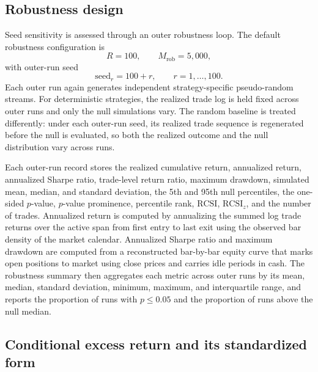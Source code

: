 \documentclass[preprint,12pt]{elsarticle}
\theoremstyle{definition}
\begin{document}
\subsection{Robustness design}

Seed sensitivity is assessed through an outer robustness loop. The default robustness configuration is
\begin{equation}
R=100, \qquad M_{\mathrm{rob}}=5{,}000,
\end{equation}
with outer-run seed
\begin{equation}
\text{seed}_r = 100 + r, \qquad r=1,\ldots,100.
\end{equation}
Each outer run again generates independent strategy-specific pseudo-random streams. For deterministic strategies, the realized trade log is held fixed across outer runs and only the null simulations vary. The random baseline is treated differently: under each outer-run seed, its realized trade sequence is regenerated before the null is evaluated, so both the realized outcome and the null distribution vary across runs.

Each outer-run record stores the realized cumulative return, annualized return, annualized Sharpe ratio, trade-level return ratio, maximum drawdown, simulated mean, median, and standard deviation, the 5th and 95th null percentiles, the one-sided \(p\)-value, \(p\)-value prominence, percentile rank, \(\mathrm{RCSI}\), \(\mathrm{RCSI}_z\), and the number of trades. Annualized return is computed by annualizing the summed log trade returns over the active span from first entry to last exit using the observed bar density of the market calendar. Annualized Sharpe ratio and maximum drawdown are computed from a reconstructed bar-by-bar equity curve that marks open positions to market using close prices and carries idle periods in cash. The robustness summary then aggregates each metric across outer runs by its mean, median, standard deviation, minimum, maximum, and interquartile range, and reports the proportion of runs with \(p\le 0.05\) and the proportion of runs above the null median.

\subsection{Conditional excess return and its standardized form}
\end{document}
